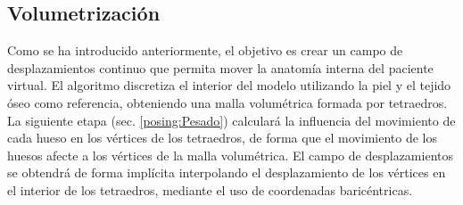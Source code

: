 \subsection{Volumetrización}
\label{posing:volumetrizacion}
%
Como se ha introducido anteriormente, el objetivo es crear un campo de desplazamientos continuo que permita mover la anatomía interna del paciente virtual. El algoritmo discretiza el interior del modelo utilizando la piel y el tejido óseo como referencia, obteniendo una malla volumétrica formada por tetraedros. %
La siguiente etapa (sec. \ref{posing:Pesado}) calculará la influencia del movimiento de cada hueso en los vértices de los tetraedros, de forma que el movimiento de los huesos afecte a los vértices de la malla volumétrica. El campo de desplazamientos se obtendrá de forma implícita interpolando el desplazamiento de los vértices en el interior de los tetraedros, mediante el uso de coordenadas baricéntricas. %


